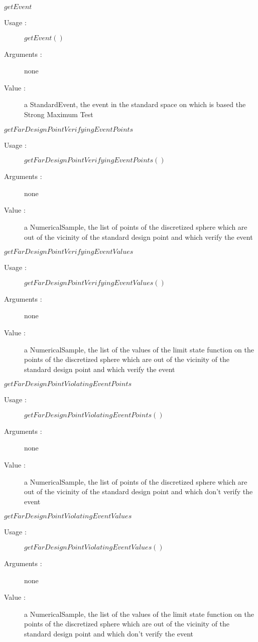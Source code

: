 \begin{description}
\begin{description}
  \item $getEvent$
    \begin{description}
    \item[Usage :] $getEvent()$
    \item[Arguments :] none
    \item[Value :]  a StandardEvent, the event in the standard space on which is based the Strong Maximum Test
    \end{description}
    \bigskip

  \item $getFarDesignPointVerifyingEventPoints$
    \begin{description}
    \item[Usage :] $getFarDesignPointVerifyingEventPoints()$
    \item[Arguments :] none
    \item[Value :]  a NumericalSample, the list of points of the discretized sphere which are out of the vicinity of the standard design point and which verify the event
    \end{description}
    \bigskip

  \item $getFarDesignPointVerifyingEventValues$
    \begin{description}
    \item[Usage :] $getFarDesignPointVerifyingEventValues()$
    \item[Arguments :] none
    \item[Value :]   a NumericalSample, the list of the values of the limit state function on the points of the discretized sphere which are out of the vicinity of the standard design point and which verify the event
    \end{description}
    \bigskip

  \item $getFarDesignPointViolatingEventPoints$
    \begin{description}
    \item[Usage :] $getFarDesignPointViolatingEventPoints()$
    \item[Arguments :] none
    \item[Value :]   a NumericalSample, the list of points of the discretized sphere which are out of the vicinity of the standard design point and which don't verify the event
    \end{description}
    \bigskip

  \item $getFarDesignPointViolatingEventValues$
    \begin{description}
    \item[Usage :] $getFarDesignPointViolatingEventValues()$
    \item[Arguments :] none
    \item[Value :]   a NumericalSample, the list of the values of the limit state function on the points of the discretized sphere which are out of the vicinity of the standard design point and which don't verify the event
    \end{description}
    \bigskip


\end{description}
\end{description}
